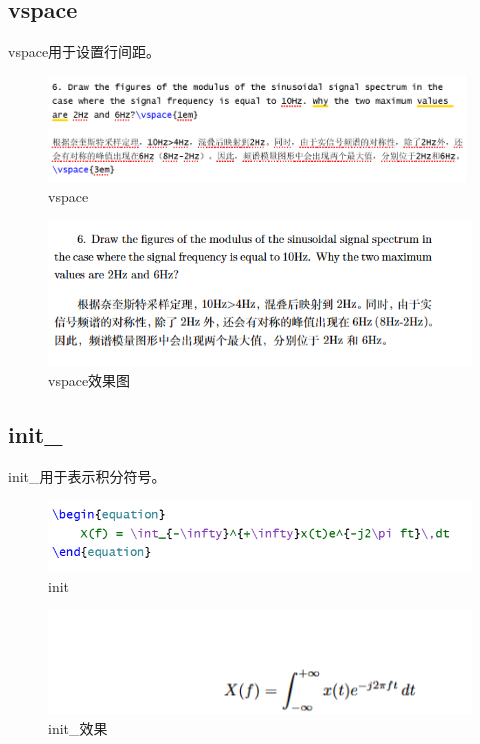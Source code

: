 \documentclass{article}
\begin{document}
\subsection{vspace}
vspace用于设置行间距。
\begin{figure}[H]
    \centering
    \includegraphics[width=1\linewidth]{vspace.png}
    \caption{vspace}
\end{figure}

\begin{figure}[H]
    \centering
    \includegraphics[width=1\linewidth]{vspace2.png}
    \caption{vspace效果图}
\end{figure}

\subsection{init_}
init\_用于表示积分符号。
\begin{figure}[H]
    \centering
    \includegraphics[width=1\linewidth]{init_.png}
    \caption{init}
\end{figure}

\begin{figure}[H]
    \centering
    \includegraphics[width=1\linewidth]{init_2.png}
    \caption{init_效果}
\end{figure}
\end{document}
